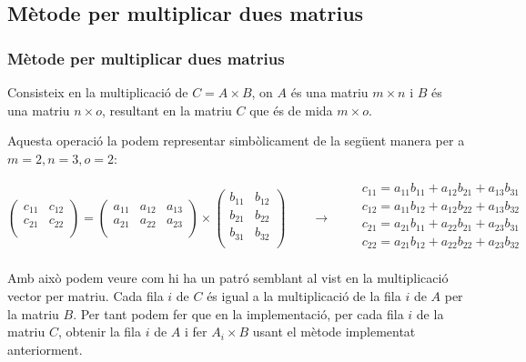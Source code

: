 \documentclass[8pt]{beamer}
\begin{document}
\begin{frame}
  
\end{frame}

\subsection[Multiplicació]{Mètode per multiplicar dues matrius}
\begin{frame}
  \frametitle{Mètode per multiplicar dues matrius}

Consisteix en la multiplicació de $C = A \times B$, on $A$ és una matriu $m \times n$ i $B$ és una matriu $n \times o$, resultant en la matriu $C$ que és de mida $m \times o$. 

Aquesta operació la podem representar simbòlicament de la següent manera per a $m = 2, n = 3, o = 2$: 

\[
\begin{pmatrix}
		  	c_{11}	&	c_{12}	\\
		  	c_{21}	&	c_{22}	\\
\end{pmatrix} = 
\begin{pmatrix}
		  	a_{11}	&	a_{12} & a_{13}\\
		  	a_{21}	&	a_{22} & a_{23}\\
\end{pmatrix} \times
\begin{pmatrix}
		  	b_{11}	&	b_{12}	\\
		  	b_{21}	&	b_{22}	\\
		  	b_{31}	&	b_{32}	\\
\end{pmatrix} \qquad \longrightarrow \qquad
\begin{matrix} 
c_{11} = a_{11}b_{11} + a_{12}b_{21} + a_{13}b_{31} \\
c_{12} = a_{11}b_{12} + a_{12}b_{22} + a_{13}b_{32} \\
c_{21} = a_{21}b_{11} + a_{22}b_{21} + a_{23}b_{31}	\\
c_{22} = a_{21}b_{12} + a_{22}b_{22} + a_{23}b_{32} \\
\end{matrix}
\]

Amb això podem veure com hi ha un patró semblant al vist en la multiplicació vector per matriu. Cada fila $i$ de $C$ és igual a la multiplicació de la fila $i$ de $A$ per la matriu $B$. Per tant podem fer que en la implementació, per cada fila $i$ de la matriu $C$, obtenir la fila $i$ de $A$ i fer $A_i \times B$ usant el mètode implementat anteriorment.
\end{frame}
\end{document}

